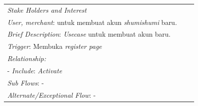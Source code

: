 \documentclass[a4paper]{article}
\begin{document}
\begin{enumerate}
\begin{enumerate}
\begin{table}[h]
\begin{tabular}{|lll}
            \multicolumn{1}{|l|}{\textit{Stake Holders and Interest}} &                               &                               \\ \cline{1-1}
            \multicolumn{1}{|l|}{\textit{User, merchant}: untuk membuat akun \textit{shumishumi} baru. }                                                     &                               &                               \\ \hline
            \multicolumn{3}{|l|}{\textit{Brief Description}: \textit{Usecase} untuk membuat akun baru.}                                                                         \\ \hline
            \multicolumn{3}{|l|}{\textit{Trigger}: Membuka\textit{ register page}}                                                                                   \\ \hline
            \multicolumn{3}{|l|}{\textit{Relationship:}}                                                                              \\ \hline
            \multicolumn{3}{|l|}{- \textit{Include}: \textit{Activate}}                                                                                                                     \\ \hline
            \multicolumn{3}{|l|}{\textit{Sub Flows}: -}                                                                                 \\ \hline
            \multicolumn{3}{|l|}{\textit{Alternate/Exceptional Flow}: -}                                                                \\ \hline
            \end{tabular}
        \end{table}


\end{enumerate}
\end{enumerate}
\end{document}
